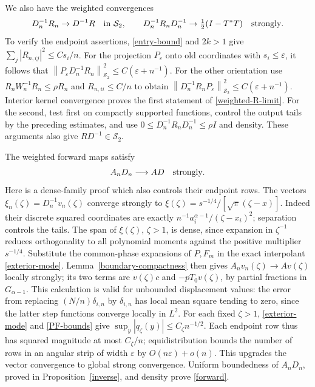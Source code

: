 \documentclass[a4paper,11pt]{amsart}
\theoremstyle{remark}\newtheorem{remark}[theorem]{Remark}
\newcommand{\HS}{\mathcal S_2}
\newcommand{\norm}[1]{\left\lVert#1\right\rVert}
\begin{document}
We also have the weighted convergences
\begin{equation}\label{weighted-R-limit}
 D_n^{-1}R_n\to D^{-1}R\quad\hbox{in }\HS,
 \qquad D_n^{-1}R_nD_n^{-1}\to\tfrac12(I-T^*T)
 \quad\hbox{strongly}.
\end{equation}
To verify the endpoint assertions, \eqref{entry-bound} and $2k>1$
give $\sum_j|R_{n,ij}|^2\le Cs_i/n$.
For the projection $P_\varepsilon$ onto old coordinates with
$s_i\le\varepsilon$, it follows that
$\norm{P_\varepsilon D_n^{-1}R_n}_{\HS}^2\le C(\varepsilon+n^{-1})$.
For the other orientation use
$R_nW_n^{-1}R_n\le\rho R_n$ and $R_{n,ii}\le C/n$ to obtain
$\norm{D_n^{-1}R_nP_\varepsilon}_{\HS}^2\le C(\varepsilon+n^{-1})$.
Interior kernel convergence proves the first statement of
\eqref{weighted-R-limit}. For the second, test first on compactly
supported functions, control the output tails by the preceding
estimates, and use $0\le D_n^{-1}R_nD_n^{-1}\le\rho I$ and density.
These arguments also give $RD^{-1}\in\HS$.

The weighted forward maps satisfy
\begin{equation}\label{forward}
 A_nD_n\longrightarrow AD\quad\hbox{strongly}.
\end{equation}
Here is a dense-family proof which also controls their endpoint rows.
The vectors $\xi_n(\zeta)=D_n^{-1}v_n(\zeta)$ converge strongly to
$\xi(\zeta)=s^{-1/4}/[\sqrt\pi(\zeta-x)]$.
Indeed their discrete squared coordinates are exactly
$n^{-1}a_i^{\alpha-1}/(\zeta-x_i)^2$; separation controls the tails.
The span of $\xi(\zeta)$, $\zeta>1$, is dense, since expansion in $\zeta^{-1}$
reduces orthogonality to all polynomial moments against the positive
multiplier $s^{-1/4}$.
Substitute the common-phase expansions of $P,F_m$ in the exact
interpolant \eqref{exterior-mode}. Lemma~\ref{boundary-compactness}
then gives $A_nv_n(\zeta)\to Av(\zeta)$ locally strongly; its two terms
are $v(\zeta)c$ and $-pT_0v(\zeta)$, by partial fractions in $G_{\alpha-1}$.
This calculation is valid for unbounded displacement values:
the error from replacing $(N/n)\delta_{i,n}$ by $\delta_{i,n}$
has local mean square tending to zero, since the latter step
functions converge locally in $L^2$.
For each fixed $\zeta>1$, \eqref{exterior-mode} and
\eqref{PF-bounds} give
$\sup_y|q_\zeta(y)|\le C_\zeta n^{-1/2}$.
Each endpoint row thus has squared magnitude at most $C_\zeta/n$;
equidistribution bounds the number of rows in an angular strip
of width $\varepsilon$ by $O(n\varepsilon)+o(n)$.
This upgrades the vector convergence to global strong convergence.
Uniform boundedness of $A_nD_n$, proved in
Proposition~\ref{inverse}, and density prove \eqref{forward}.
\end{document}
